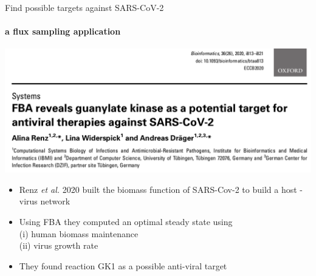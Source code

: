 \documentclass{beamer}
\begin{document}
   \begin{frame}{Find possible targets against SARS-CoV-2}
      \framesubtitle{a flux sampling application}
      \bigskip
      \includegraphics[scale=0.27]{ ../met_nets/resources//covid_paper.png}
      
      \begin{singlespace}
         \begin{itemize}
            \item \small Renz \textit{et al.} 2020 built the biomass function of SARS-Cov-2 to build a host - virus network
            \item \small Using FBA they computed an optimal steady state using \\ \small \quad (i) human biomass maintenance\\ \small \quad (ii) virus growth rate
            \item \small They found reaction GK1 as a possible anti-viral target
         \end{itemize}            
      \end{singlespace}

   \end{frame}
\end{document}
